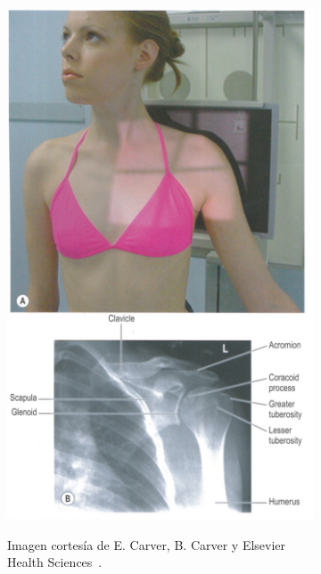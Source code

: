 \begin{figure}[h]
    \begin{subfigure}[b]{0.45\linewidth}
        \centering
        {\includegraphics[width=\linewidth]{IMG/carvershoulder.PNG}}
        \caption{Imagen cortesía de E. Carver, B. Carver y Elsevier Health Sciences~\cite{carver2012medical}.}
    \end{subfigure}
    \null\hfill
     \begin{subfigure}[b]{0.45\linewidth}
        \centering

\end{subfigure}
\end{figure}
